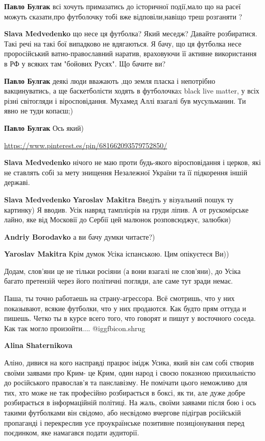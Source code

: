 \begin{itemize}
\begin{itemize}
\textbf{Павло Булгак} всі хочуть примазатись до історичної події,мало що на расеї можуть сказати,про футболочку тобі вже відповіли,навіщо треш розганяти ?

\textbf{Slava Medvedenko} що несе ця футболка? Який меседж? Давайте розбиратися. Такі речі на такі бої випадково не вдягаються. Я бачу, що ця футболка несе проросійський ватно-православний наратив, враховуючи її активне використання в РФ у всяких там "бойових Русях". Що бачите ви?

\textbf{Павло Булгак} деякі люди вважають ,що земля пласка і непотрібно вакцинуватись, а ще баскетболісти ходять в футболочкаx black live matter, у всіх різні світогляди і віросповідання. Мухамед Аллі взагалі був мусульманин. Ти явно не туди копаєш;)

\textbf{Павло Булгак} Ось який)

\url{https://www.pinterest.es/pin/681662093579752850/}

\textbf{Slava Medvedenko} нічого не маю проти будь-якого віросповідання і церков, які не ставлять собі за мету знищення Незалежної України та її підкорення іншій державі.

\textbf{Slava Medvedenko}
\textbf{Yaroslav Makitra}
Введіть у візуальний пошук ту картинку)
Я вводив.
Усік навряд тамплієрів на груди ліпив.
А от рускомірське лайно, яке від Московії до Сербії цей малюнок розповсюджує, залюбки)

\textbf{Andriy Borodavko} а ви бачу думки читаєте?)

\textbf{Yaroslav Makitra}
Крім думок Усіка іспанською.
Цим опікуєтеся Ви))

Додам, слов'яни це не тільки росіяни (а вони взагалі не слов'яни), до Усіка
багато претензій через його політичні погляди, але саме тут зради немає.



Паша, ты точно работаешь на страну-агрессора. Всё смотришь, что у них
показывают, всякие футболки, что у них продаются. Как будто прям оттуда и
пишешь. Четко ты в курсе всего того, что говорят и пишут у восточного соседа.
Как так могло произойти....  @igg{fbicon.shrug} 

\textbf{Alina Shaternikova} 

Аліно, дивися на кого насправді працює імідж Усика, який він сам собі створив
своїми заявами про Крим- це Крим, один народ і своєю показною прихильністю до
російського православ'я та панславізму. Не помічати цього неможливо для тих,
хто може не так професійно розбирається в боксі, як ти, але дуже добре
розбирається в інформаційній політиці. На жаль, своїми заявами після бою і ось
такими футболками він свідомо, або несвідомо вчергове підіграв російській
пропаганді і перекреслив усе проукраїнське позитивне позиціонування перед
поєдинком, яке намагався подати аудиторії.


\end{itemize}
\end{itemize}

